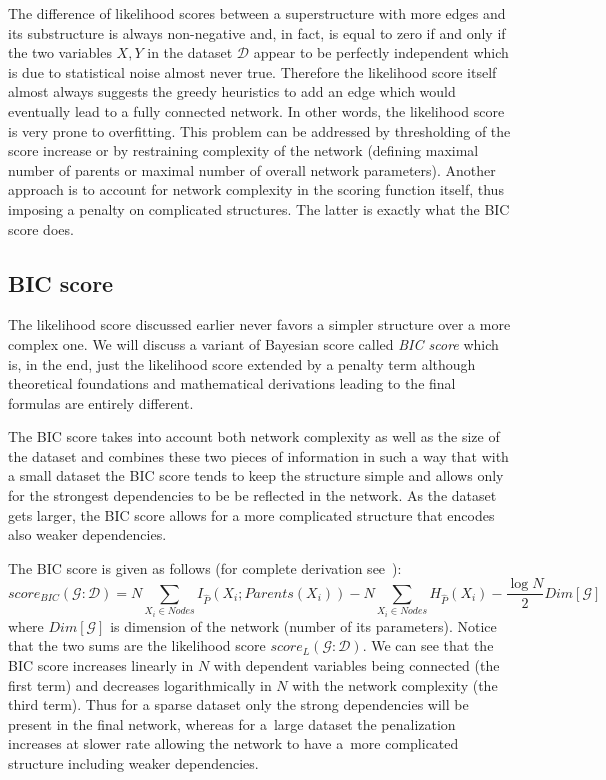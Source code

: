 \documentclass[english,cover]{fitthesis} %
\newcommand{\term}[1]{\emph{#1}}           %
\newcommand{\note}[1]{{\color{green}#1}}
\begin{document}
\medskip
The difference of likelihood scores between a superstructure with more edges and its substructure is always non-negative and, in fact, is equal to zero if and only if the two variables $X,Y$ in the dataset $\mathcal{D}$ appear to be perfectly independent which is due to statistical noise almost never true. Therefore the likelihood score itself almost always suggests the greedy heuristics to add an edge which would eventually lead to a fully connected network. In other words, the likelihood score is very prone to overfitting. This problem can be addressed by thresholding of the score increase or by restraining complexity of the network (defining maximal number of parents or maximal number of overall network parameters). Another approach is to account for network complexity in the scoring function itself, thus imposing a penalty on complicated structures. The latter is exactly what the BIC score does.



\subsection{BIC score}
The likelihood score discussed earlier never favors a simpler structure over a more complex one. We will discuss a variant of Bayesian score called \term{BIC score} which is, in the end, just the likelihood score extended by a penalty term although theoretical foundations and mathematical derivations leading to the final formulas are entirely different.


The BIC score takes into account both network complexity as well as the size of the dataset and combines these two pieces of information in such a way that with a small dataset the BIC score tends to keep the structure simple and allows only for the strongest dependencies to be be reflected in the network. As the dataset gets larger, the BIC score allows for a more complicated structure that encodes also weaker dependencies.

The BIC score is given as follows (for complete derivation see~\cite[p.~794]{pgm}):
\begin{equation}
    score_{BIC}(\mathcal{G} : \mathcal{D}) = N \!\!\!\!\!\! \sum_{X_i \in Nodes} \!\!\!\!\!\! I_{\hat P}(X_i;Parents(X_i)) - N \!\!\!\!\!\! \sum_{X_i \in Nodes} \!\!\!\!\!\! H_{\hat P}(X_i) - \frac{\log N}{2} Dim[\mathcal{G}]
\end{equation}
where $Dim[\mathcal{G}]$ is dimension of the network (number of its parameters). Notice that the two sums are the likelihood score $score_{L}(\mathcal{G} : \mathcal{D})$. We can see that the BIC score increases linearly in $N$ with dependent variables being connected (the first term) and decreases logarithmically in $N$ with the network complexity (the third term). Thus for a sparse dataset only the strong dependencies will be present in the final network, whereas for a~large dataset the penalization increases at slower rate allowing the network to have a~more complicated structure including weaker dependencies.
\end{document}
